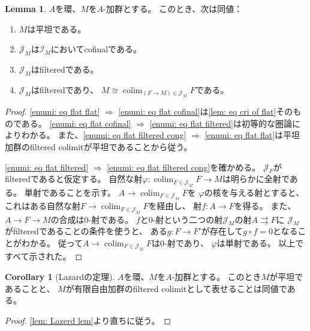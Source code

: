 \documentclass[uplatex]{jsarticle}
\theoremstyle{definition}
\newtheorem{cor}[cor]{Corollary}
\newtheorem{lem}[lem]{Lemma}
\theoremstyle{plain}
\DeclareMathOperator{\colim}{\mathrm{colim}}
\newcommand{\mcI}{\mathcal{I}}
\newcommand{\mcJ}{\mathcal{J}}
\begin{document}
\begin{lem}\label{lem: Lazerd lem}
  \(A\)を環、\(M\)を\(A\)-加群とする。
  このとき、次は同値：
  \begin{enumerate}
    \item \label{enumi: eq flat flat}
    \(M\)は平坦である。
    \item \label{enumi: eq flat cofinal}
    \(\mcJ_M\)は\(\mcI_M\)においてcofinalである。
    \item \label{enumi: eq flat filtered}
    \(\mcJ_M\)はfilteredである。
    \item \label{enumi: eq flat filtered cong}
    \(\mcJ_M\)はfilteredであり、
    \(M\cong \colim _{(F\to M)\in \mcJ_M}F\)である。
  \end{enumerate}
\end{lem}

\begin{proof}
  \ref{enumi: eq flat flat} \(\Rightarrow\)
  \ref{enumi: eq flat cofinal}は\autoref{lem: eq cri of flat}そのものである。
  \ref{enumi: eq flat cofinal} \(\Rightarrow\)
  \ref{enumi: eq flat filtered}は初等的な圏論によりわかる。
  また、\ref{enumi: eq flat filtered cong} \(\Rightarrow\)
  \ref{enumi: eq flat flat}は平坦加群のfiltered colimitが平坦であることから従う。

  \ref{enumi: eq flat filtered} \(\Rightarrow\)
  \ref{enumi: eq flat filtered cong}を確かめる。
  \(\mcJ_F\)がfilteredであると仮定する。
  自然な射\(\varphi:\colim_{F\in \mcJ_M}F\to M\)は明らかに全射である。
  単射であることを示す。
  \(A\to \colim_{F\in\mcJ_M}F\)を
  \(\varphi\)の核を与える射とすると、
  これはある自然な射\(F\to \colim_{F\in\mcJ_M}F\)を経由し、
  射\(f:A\to F\)を得る。
  また、\(A\to F\to M\)の合成は\(0\)-射である。
  \(f\)と\(0\)-射という二つの射\(\mcJ_M\)の射\(A\rightrightarrows F\)に
  \(\mcJ_M\)がfilteredであることの条件を使うと、
  ある\(g:F\to F'\)が存在して\(g\circ f=0\)となることがわかる。
  従って\(A\to \colim_{F\in\mcJ_M}F\)は\(0\)-射であり、
  \(\varphi\)は単射である。
  以上ですべて示された。
\end{proof}



\begin{cor}[Lazardの定理]
  \(A\)を環、\(M\)を\(A\)-加群とする。
  このとき\(M\)が平坦であることと、
  \(M\)が有限自由加群のfiltered colimitとして表せることは同値である。
\end{cor}

\begin{proof}
  \autoref{lem: Lazerd lem}より直ちに従う。
\end{proof}
\end{document}
